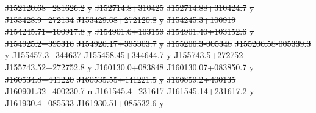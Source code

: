 \documentclass[11pt, a4paper]{book}
\providecommand{\DIFdeltex}[1]{{\protect\color{red}\sout{#1}}}                      %
\providecommand{\DIFdelFL}[1]{\DIFdel{#1}} %
\providecommand{\DIFdel}[1]{\texorpdfstring{\DIFdeltex{#1}}{}} %
\begin{document}
\DIFdelFL{J152120.68+281626.2 }%
\DIFdelFL{y}%
\DIFdelFL{J152714.8+310425 }%
\DIFdelFL{J152714.88+310424.7 }%
\DIFdelFL{y}%
\DIFdelFL{J153428.9+272134 }%
\DIFdelFL{J153429.68+272120.8 }%
\DIFdelFL{y}%
\DIFdelFL{J154245.3+100919 }%
\DIFdelFL{J154245.71+100917.8 }%
\DIFdelFL{y}%
\DIFdelFL{J154901.6+103159 }%
\DIFdelFL{J154901.40+103152.6 }%
\DIFdelFL{y}%
\DIFdelFL{J154925.2+395316 }%
\DIFdelFL{J154926.17+395303.7 }%
\DIFdelFL{y}%
\DIFdelFL{J155206.3-005348 }%
\DIFdelFL{J155206.58-005339.3 }%
\DIFdelFL{y}%
\DIFdelFL{J155457.3+344637 }%
\DIFdelFL{J155458.45+344644.7 }%
\DIFdelFL{y}%
\DIFdelFL{J155743.5+272752 }%
\DIFdelFL{J155743.52+272752.8 }%
\DIFdelFL{y}%
\DIFdelFL{J160130.0+083848 }%
\DIFdelFL{J160130.07+083850.7 }%
\DIFdelFL{y}%
\DIFdelFL{J160534.8+441220 }%
\DIFdelFL{J160535.55+441221.5 }%
\DIFdelFL{y}%
\DIFdelFL{J160859.2+400135 }%
\DIFdelFL{J160901.32+400230.7 }%
\DIFdelFL{n}%
\DIFdelFL{J161545.4+231617 }%
\DIFdelFL{J161545.14+231617.2 }%
\DIFdelFL{y}%
\DIFdelFL{J161930.4+085533 }%
\DIFdelFL{J161930.51+085532.6 }%
\DIFdelFL{y}%
\end{document}
